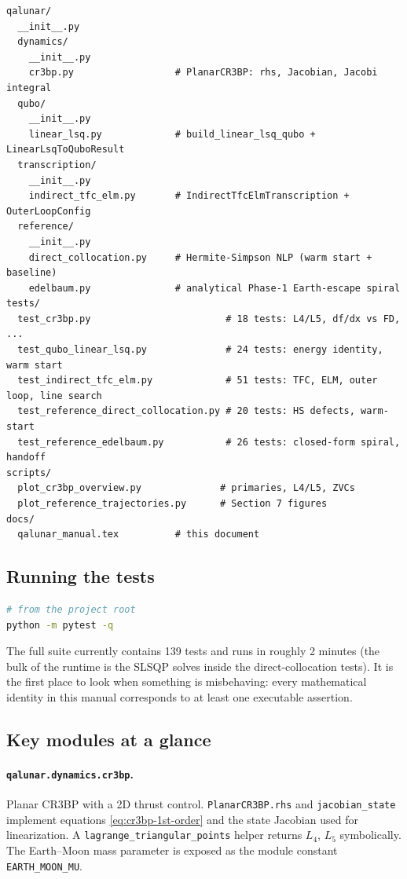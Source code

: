 \documentclass[8pt,a4paper]{article}
\theoremstyle{definition}
\theoremstyle{remark}
\begin{document}
\begin{lstlisting}[basicstyle=\ttfamily\small]
qalunar/
  __init__.py
  dynamics/
    __init__.py
    cr3bp.py                  # PlanarCR3BP: rhs, Jacobian, Jacobi integral
  qubo/
    __init__.py
    linear_lsq.py             # build_linear_lsq_qubo + LinearLsqToQuboResult
  transcription/
    __init__.py
    indirect_tfc_elm.py       # IndirectTfcElmTranscription + OuterLoopConfig
  reference/
    __init__.py
    direct_collocation.py     # Hermite-Simpson NLP (warm start + baseline)
    edelbaum.py               # analytical Phase-1 Earth-escape spiral
tests/
  test_cr3bp.py                        # 18 tests: L4/L5, df/dx vs FD, ...
  test_qubo_linear_lsq.py              # 24 tests: energy identity, warm start
  test_indirect_tfc_elm.py             # 51 tests: TFC, ELM, outer loop, line search
  test_reference_direct_collocation.py # 20 tests: HS defects, warm-start
  test_reference_edelbaum.py           # 26 tests: closed-form spiral, handoff
scripts/
  plot_cr3bp_overview.py              # primaries, L4/L5, ZVCs
  plot_reference_trajectories.py      # Section 7 figures
docs/
  qalunar_manual.tex          # this document
\end{lstlisting}

\subsection{Running the tests}

\begin{lstlisting}[language=bash]
# from the project root
python -m pytest -q
\end{lstlisting}

The full suite currently contains 139 tests and runs in roughly 2
minutes (the bulk of the runtime is the SLSQP solves inside the
direct-collocation tests). It is the first place to look when
something is misbehaving: every mathematical identity in this manual
corresponds to at least one executable assertion.

\subsection{Key modules at a glance}

\paragraph{\texttt{qalunar.dynamics.cr3bp}.}
Planar CR3BP with a 2D thrust control. \texttt{PlanarCR3BP.rhs} and
\texttt{jacobian\_state} implement equations
\eqref{eq:cr3bp-1st-order} and the state Jacobian used for
linearization. A \texttt{lagrange\_triangular\_points} helper
returns $L_4$, $L_5$ symbolically. The Earth--Moon mass parameter is
exposed as the module constant \texttt{EARTH\_MOON\_MU}.
\end{document}
